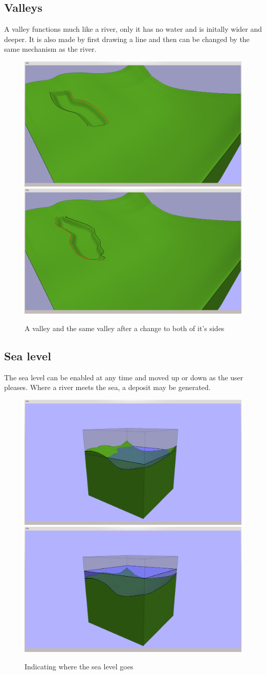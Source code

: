 \documentclass[a4paper,12pt]{report}
\begin{document}
\subsection{Valleys}
A valley functions much like a river, only it has no water and is initally wider and deeper. It is also made by first drawing a line and then can be changed by the same mechanism as the river.
\begin{figure}
\includegraphics[trim = 10mm 80mm 200mm 30mm, clip,width=.5\linewidth]{thesis/results/valleyMade.png}
\includegraphics[trim = 10mm 80mm 200mm 30mm, clip,width=.5\linewidth]{thesis/results/valleyChanged.png}
 \caption{A valley and the same valley after a change to both of it's sides }
 \label{fig:valley}
\end{figure}

\subsection{Sea level}
The sea level can be enabled at any time and moved up or down as the user pleases. Where a river meets the sea, a deposit may be generated.

\begin{figure}
\includegraphics[trim = 90mm 7mm 80mm 30mm, clip,width=.5\linewidth]{thesis/results/seaEnabled.png}
\includegraphics[trim = 90mm 7mm 80mm 30mm, clip,width=.5\linewidth]{thesis/results/seaChanged.png}
 \caption{Indicating where the sea level goes}
 \label{fig:seaLevel}
\end{figure}
\end{document}
